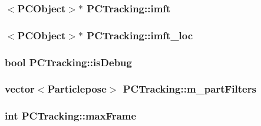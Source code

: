 \hypertarget{class_p_c_tracking_aeaa5bcbc69a1c426360f3e06aac7cef9}{
\subsubsection[{imft}]{$<${\bf \-P\-C\-Object}$>$$\ast$ {\bf \-P\-C\-Tracking\-::imft}}}\label{class_p_c_tracking_aeaa5bcbc69a1c426360f3e06aac7cef9}
\hypertarget{class_p_c_tracking_a08ee78ad7493830226491b49bf72e514}{
\subsubsection[{imft\-\_\-loc}]{$<${\bf \-P\-C\-Object}$>$$\ast$ {\bf \-P\-C\-Tracking\-::imft\-\_\-loc}}}\label{class_p_c_tracking_a08ee78ad7493830226491b49bf72e514}
\hypertarget{class_p_c_tracking_a9f0e2ba11bbca068561a58836decca07}{
\subsubsection[{is\-Debug}]{\setlength{\rightskip}{0pt plus 5cm}bool {\bf \-P\-C\-Tracking\-::is\-Debug}}}\label{class_p_c_tracking_a9f0e2ba11bbca068561a58836decca07}
\hypertarget{class_p_c_tracking_a8347f3c784c2b3fafc59581dc9aa58fa}{
\subsubsection[{m\-\_\-part\-Filters}]{\setlength{\rightskip}{0pt plus 5cm}vector$<${\bf \-Particlepose}$>$ {\bf \-P\-C\-Tracking\-::m\-\_\-part\-Filters}}}\label{class_p_c_tracking_a8347f3c784c2b3fafc59581dc9aa58fa}
\hypertarget{class_p_c_tracking_ab6a388338aacd6fcccf5dcd49f7c23fb}{
\subsubsection[{max\-Frame}]{\setlength{\rightskip}{0pt plus 5cm}int {\bf \-P\-C\-Tracking\-::max\-Frame}}}\label{class_p_c_tracking_ab6a388338aacd6fcccf5dcd49f7c23fb}
